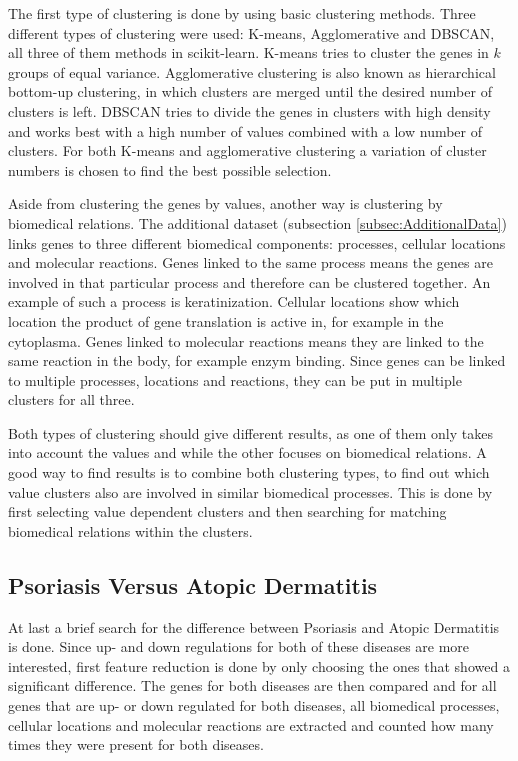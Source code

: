 \documentclass[10pt,a4paper]{article}
\begin{document}
	The first type of clustering is done by using basic clustering methods. Three different types of clustering were used: K-means, Agglomerative and DBSCAN, all three of them methods in scikit-learn. K-means tries to cluster the genes in $k$ groups of equal variance. Agglomerative clustering is also known as hierarchical bottom-up clustering, in which clusters are merged until the desired number of clusters is left. DBSCAN tries to divide the genes in clusters with high density and works best with a high number of values combined with a low number of clusters. For both K-means and agglomerative clustering a variation of cluster numbers is chosen to find the best possible selection. 
	
	Aside from clustering the genes by values, another way is clustering by biomedical relations. The additional dataset (subsection \ref{subsec:AdditionalData}) links genes to three different biomedical components: processes, cellular locations and molecular reactions. Genes linked to the same process means the genes are involved in that particular process and therefore can be clustered together. An example of such a process is keratinization. Cellular locations show which location the product of gene translation is active in, for example in the cytoplasma. Genes linked to molecular reactions means they are linked to the same reaction in the body, for example enzym binding. Since genes can be linked to multiple processes, locations and reactions, they can be put in multiple clusters for all three.
	
	Both types of clustering should give different results, as one of them only takes into account the values and while the other focuses on biomedical relations. A good way to find results is to combine both clustering types, to find out which value clusters also are involved in similar biomedical processes. This is done by first selecting value dependent clusters and then searching for matching biomedical relations within the clusters.
	
	\subsection{Psoriasis Versus Atopic Dermatitis}
	\label{subsec:MethodsPsoriasisVersusAtopicDermatitis}
	
	At last a brief search for the difference between Psoriasis and Atopic Dermatitis is done. Since up- and down regulations for both of these diseases are more interested, first feature reduction is done by only choosing the ones that showed a significant difference. The genes for both diseases are then compared and for all genes that are up- or down regulated for both diseases, all biomedical processes, cellular locations and molecular reactions are extracted and counted how many times they were present for both diseases. 
	
\end{document}

